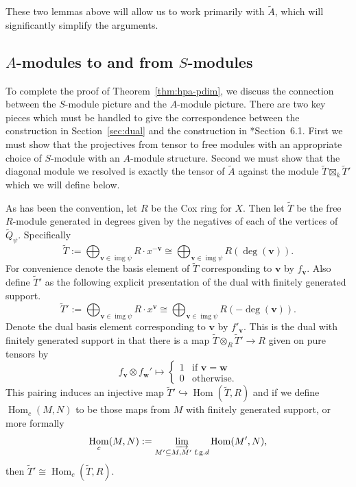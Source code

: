 \documentclass{amsart}
\newcommand{\field}{k}
\DeclareMathOperator{\Hom}{Hom}
\DeclareMathOperator{\img}{img}
\theoremstyle{remark}
\begin{document}
These two lemmas above will allow us to work primarily with $\widetilde{A}$, which will significantly simplify the arguments.

\subsection*{\texorpdfstring{$A$}{A}-modules to and from \texorpdfstring{$S$}{S}-modules}

To complete the proof of Theorem~\ref{thm:hpa-pdim},
we discuss the connection between the $S$-module picture and the $A$-module picture.
There are two key pieces which must be handled to give the correspondence between the construction in Section~\ref{sec:dual} and the construction in \cite{FH25}*{Section~6.1}.
First we must show that the projectives from \cite{FH25} tensor to free modules with an appropriate choice of $S$-module with an $A$-module structure.
Second we must show that the diagonal module we resolved is exactly the tensor of $\widetilde{A}$ against the module $\widetilde{T}\boxtimes_{\field} \widetilde{T}'$ which we will define below.

As has been the convention, let $R$ be the Cox ring for $X$. Then let $\widetilde{T}$ be the free $R$-module generated in degrees given by the negatives of each of the vertices of $\widetilde{Q}_\psi$. Specifically 
\begin{equation}
  \widetilde{T} := \bigoplus_{\bm{v}\in \img \psi} R\cdot x^{-\bm{v}} \cong \bigoplus_{\bm{v}\in \img \psi} R(\deg (\bm{v})).
\end{equation}
For convenience denote the basis element of $\widetilde{T}$ corresponding to $\bm{v}$ by $f_{\bm{v}}$. Also define $\widetilde{T}'$ as the following explicit presentation of the dual with finitely generated support.
\begin{equation}
  \widetilde{T}' := \bigoplus_{\bm{v}\in \img \psi} R\cdot x^{\bm{v}} \cong \bigoplus_{\bm{v}\in \img \psi} R(-\deg (\bm{v})).
\end{equation}
Denote the dual basis element corresponding to $\bm{v}$ by $f'_{\bm{v}}$. This is the dual with finitely generated support in that there is a map $\widetilde{T}\otimes_{R} \widetilde{T}'\rightarrow R$ given on pure tensors by
\[f_{\bm{v}}\otimes f_{\bm{w}}' \mapsto 
\begin{cases}
  1 & \text{if }\bm{v}=\bm{w}\\
  0 & \text{otherwise}.
\end{cases}
\]
This pairing induces an injective map $\widetilde{T}'\hookrightarrow \Hom(\widetilde{T},R)$ and if we define $\Hom_c(M,N)$ to be those maps from $M$ with finitely generated support, or more formally
\[\Hom_c(M,N) := \varinjlim_{M'\subseteq M, M'\text{ f.g.}d}\Hom(M',N),\]
then $\widetilde{T}'\cong \Hom_c(\widetilde{T},R)$.
\end{document}
